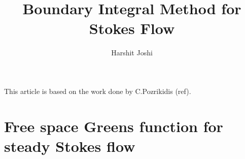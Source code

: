 \documentclass[12pt]{article}
\title{Boundary Integral Method for Stokes Flow}
\author{Harshit Joshi}
\begin{document}
\newcommand{\dx}{\boldsymbol{x} - \boldsymbol{x_0}}

\newcommand{\bx}{\boldsymbol{x}}

\newcommand{\divv}{\boldsymbol{\nabla}\cdot}

\newcommand{\bxo}{\boldsymbol{x_0}}

\newcommand{\xCx}{\boldsymbol{x},\boldsymbol{x_0}}

\maketitle
This article is based on the work done by C.Pozrikidis (ref). 

\section{Free space Greens function for steady Stokes flow}
\end{document}
